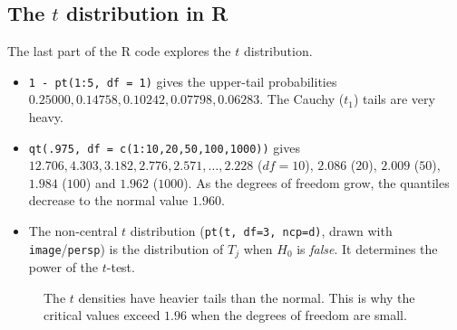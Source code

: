 \subsection{The $t$ distribution in R}
The last part of the R code explores the $t$ distribution.
\begin{itemize}
  \item \texttt{1 - pt(1:5, df = 1)} gives the upper-tail probabilities $0.25000, 0.14758, 0.10242, 0.07798, 0.06283$. The Cauchy ($t_1$) tails are very heavy.
  \item \texttt{qt(.975, df = c(1:10,20,50,100,1000))} gives $12.706, 4.303, 3.182, 2.776, 2.571,\dots,2.228$ ($df=10$), $2.086$ ($20$), $2.009$ ($50$), $1.984$ ($100$) and $1.962$ ($1000$). As the degrees of freedom grow, the quantiles decrease to the normal value $1.960$.
  \item The non-central $t$ distribution (\texttt{pt(t, df=3, ncp=d)}, drawn with \texttt{image}/\texttt{persp}) is the distribution of $T_j$ when $H_0$ is \emph{false}. It determines the power of the $t$-test.
\end{itemize}

\begin{figure}[ht]
\centering
{}
\caption{The $t$ densities have heavier tails than the normal. This is why the critical values exceed $1.96$ when the degrees of freedom are small.}
\label{fig:L16-t}
\end{figure}

